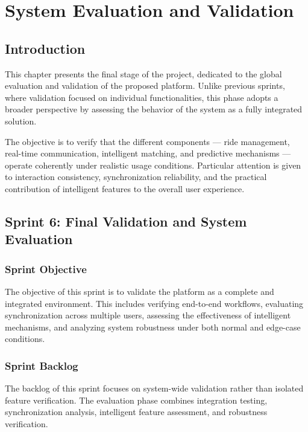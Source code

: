 \chapter{System Evaluation and Validation}

\section{Introduction}

This chapter presents the final stage of the project, dedicated to the global evaluation and validation of the proposed platform. Unlike previous sprints, where validation focused on individual functionalities, this phase adopts a broader perspective by assessing the behavior of the system as a fully integrated solution.

The objective is to verify that the different components — ride management, real-time communication, intelligent matching, and predictive mechanisms — operate coherently under realistic usage conditions. Particular attention is given to interaction consistency, synchronization reliability, and the practical contribution of intelligent features to the overall user experience.


\section{Sprint 6: Final Validation and System Evaluation}

\subsection{Sprint Objective}

The objective of this sprint is to validate the platform as a complete and integrated environment. This includes verifying end-to-end workflows, evaluating synchronization across multiple users, assessing the effectiveness of intelligent mechanisms, and analyzing system robustness under both normal and edge-case conditions.


\subsection{Sprint Backlog}

The backlog of this sprint focuses on system-wide validation rather than isolated feature verification. The evaluation phase combines integration testing, synchronization analysis, intelligent feature assessment, and robustness verification.

